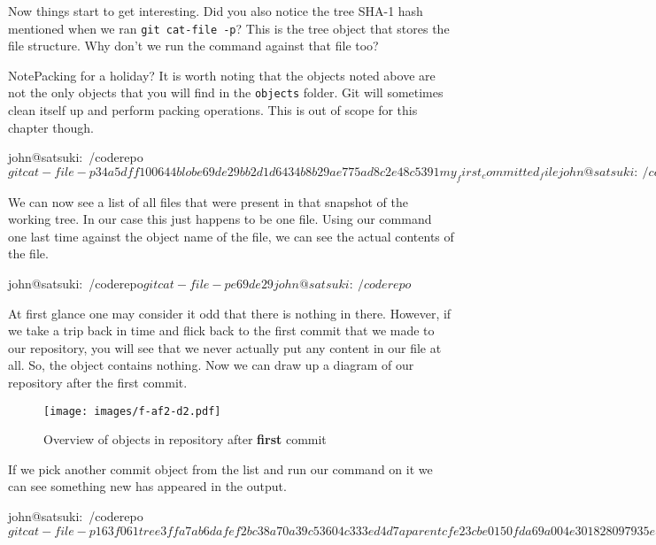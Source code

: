 Now things start to get interesting.
Did you also notice the tree SHA-1 hash mentioned when we ran \texttt{git cat-file -p}? This is the tree object that stores the file structure.
Why don't we run the command against that file too?

\begin{callout}{Note}{Packing for a holiday?}
It is worth noting that the objects noted above are not the only objects that you will find in the \texttt{objects} folder.
Git will sometimes clean itself up and perform packing operations.
This is out of scope for this chapter though.
\end{callout}

\begin{code}
john@satsuki:~/coderepo$ git cat-file -p 34a5dff
100644 blob e69de29bb2d1d6434b8b29ae775ad8c2e48c5391
 my_first_committed_file
john@satsuki:~/coderepo$
\end{code}

We can now see a list of all files that were present in that snapshot of the working tree.
In our case this just happens to be one file.
Using our command one last time against the object name of the file, we can see the actual contents of the file.

\begin{code}
john@satsuki:~/coderepo$ git cat-file -p e69de29
john@satsuki:~/coderepo$
\end{code}

At first glance one may consider it odd that there is nothing in there.
However, if we take a trip back in time and flick back to the first commit that we made to our repository, you will see that we never actually put any content in our file at all.
So, the object contains nothing.
Now we can draw up a diagram of our repository after the first commit.

\begin{figure}[hbt]
\centering
\texttt{[image: images/f-af2-d2.pdf]}
\caption{Overview of objects in repository after \textbf{first} commit}
\end{figure}

If we pick another commit object from the list and run our command on it we can see something new has appeared in the output.

\begin{code}
john@satsuki:~/coderepo$ git cat-file -p 163f061
tree 3ffa7ab6dafef2bc38a70a39c53604c333ed4d7a
parent cfe23cbe0150fda69a004e301828097935ec4397
author John Haskins <john.haskins@tamagoyakiinc.koala> 1301599979 +0100
committer John Haskins <john.haskins@tamagoyakiinc.koala> 1301599979 +0100

Made a few changes to first and second files
john@satsuki:~/coderepo$
\end{code}

